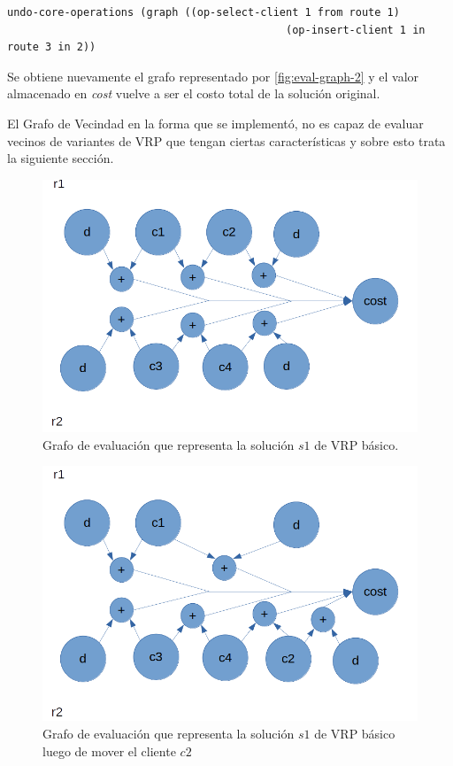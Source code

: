 \begin{lstlisting}
undo-core-operations (graph ((op-select-client 1 from route 1)
											(op-insert-client 1 in route 3 in 2))
\end{lstlisting}

Se obtiene nuevamente el grafo representado por \ref{fig:eval-graph-2} y el valor almacenado en \textit{cost} vuelve a ser el costo total de la solución original.

El Grafo de Vecindad en la forma que se implementó, no es capaz de evaluar vecinos de variantes de VRP que tengan ciertas características y sobre esto trata la siguiente sección.

\begin{figure}
	\centering
	\includegraphics[width=0.9\linewidth]{Graphics/eval-graph-2}
	\caption{Grafo de evaluación que representa la solución $s1$ de VRP básico.}
	\label{fig:eval-graph-5}
\end{figure}

\begin{figure}
	\centering
	\includegraphics[width=0.9\linewidth]{Graphics/eval-graph-4}
	\caption{Grafo de evaluación que representa la solución $s1$ de VRP básico luego de mover el cliente $c2$}
	\label{fig:eval-graph-6}
\end{figure}

